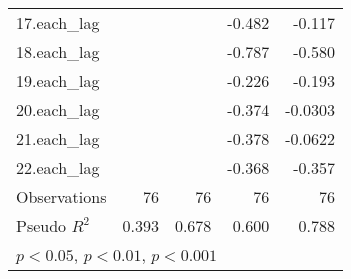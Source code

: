 \begin{table}[htbp]
\begin{tabular}{l*{4}{D{.}{.}{-1}}}
17.each\_lag         &                     &                     &      -0.482\sym{**} &      -0.117         \\
18.each\_lag         &                     &                     &      -0.787\sym{**} &      -0.580\sym{***}\\
19.each\_lag         &                     &                     &      -0.226\sym{*}  &      -0.193\sym{***}\\
20.each\_lag         &                     &                     &      -0.374\sym{*}  &     -0.0303         \\
21.each\_lag         &                     &                     &      -0.378         &     -0.0622         \\
22.each\_lag         &                     &                     &      -0.368\sym{***}&      -0.357\sym{***}\\
\midrule
Observations        &          76         &          76         &          76         &          76         \\
Pseudo \(R^{2}\)    &       0.393         &       0.678         &       0.600         &       0.788         \\
\bottomrule
{}\\
\end{tabular}
\end{table}
